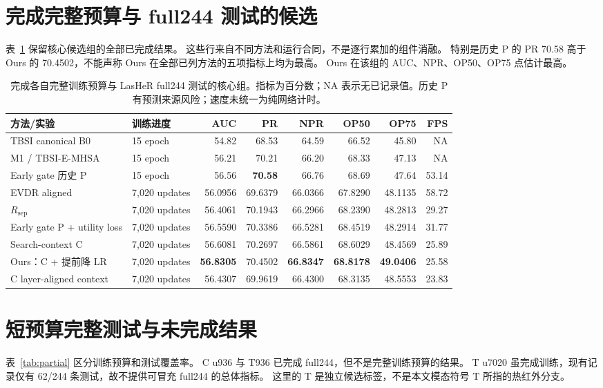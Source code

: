 \documentclass[journal]{IEEEtran}
\newcommand{\T}{\mathrm{T}}
\begin{document}
\appendices
\section{完成完整预算与 full244 测试的候选}
表~\ref{tab:all} 保留核心候选组的全部已完成结果。
这些行来自不同方法和运行合同，不是逐行累加的组件消融。
特别是历史 P 的 PR 70.58 高于 Ours 的 70.4502，不能声称 Ours 在全部已列方法的五项指标上均为最高。
Ours 在该组的 AUC、NPR、OP50、OP75 点估计最高。

\begin{table}[t]
\centering
\caption{完成各自完整训练预算与 LasHeR full244 测试的核心组。指标为百分数；NA 表示无已记录值。历史 P 有预测来源风险；速度未统一为纯网络计时。}
\label{tab:all}
\small
\setlength{\tabcolsep}{3pt}
\begin{tabular}{@{}llrrrrrr@{}}
\toprule
方法/实验 & 训练进度 & AUC & PR & NPR & OP50 & OP75 & FPS\\
\midrule
TBSI canonical B0 & 15 epoch & 54.82 & 68.53 & 64.59 & 66.52 & 45.80 & NA\\
M1 / TBSI-E-MHSA & 15 epoch & 56.21 & 70.21 & 66.20 & 68.33 & 47.13 & NA\\
Early gate 历史 P & 15 epoch & 56.56 & \textbf{70.58} & 66.76 & 68.69 & 47.64 & 53.14\\
EVDR aligned & 7,020 updates & 56.0956 & 69.6379 & 66.0366 & 67.8290 & 48.1135 & 58.72\\
$R_{\mathrm{sep}}$ & 7,020 updates & 56.4061 & 70.1943 & 66.2966 & 68.2390 & 48.2813 & 29.27\\
Early gate P + utility loss & 7,020 updates & 56.5590 & 70.3386 & 66.5281 & 68.4519 & 48.2914 & 31.77\\
Search-context C & 7,020 updates & 56.6081 & 70.2697 & 66.5861 & 68.6029 & 48.4569 & 25.89\\
Ours：C + 提前降 LR & 7,020 updates & \textbf{56.8305} & 70.4502 & \textbf{66.8347} & \textbf{68.8178} & \textbf{49.0406} & 25.58\\
C layer-aligned context & 7,020 updates & 56.4307 & 69.9619 & 66.4300 & 68.3135 & 48.5553 & 23.83\\
\bottomrule
\end{tabular}
\end{table}

\section{短预算完整测试与未完成结果}
表~\ref{tab:partial} 区分训练预算和测试覆盖率。
C u936 与 T936 已完成 full244，但不是完整训练预算的结果。
T u7020 虽完成训练，现有记录仅有 62/244 条测试，故不提供可冒充 full244 的总体指标。
这里的 T 是独立候选标签，不是本文模态符号 $\T$ 所指的热红外分支。
\end{document}
